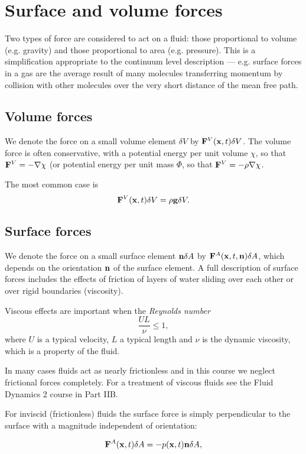 \documentclass{notes}
\newcommand{\grad}{\nabla}
\begin{document}
\section{Surface and volume forces}

Two types of force are considered to act on a fluid: those
proportional to volume (e.g. gravity) and those proportional to area
(e.g. pressure).  This is a simplification appropriate to the
continuum level description --- e.g. surface forces in a gas are the
average result of many molecules transferring momentum by collision
with other molecules over the very short distance of the mean free
path.

\subsection*{Volume forces}

We denote the force on a small volume element $\delta V$ by
$\mathbf{F}^V(\mathbf{x},t) \delta V$.  The volume force is often conservative, with a
potential energy per unit volume $\chi$, so that $\vF^V = -
\grad\chi$ (or potential energy per unit mass $\Phi$, so that $\vF^V
= - \rho \grad\chi$.

The most common case is
\[
\mathbf{F}^V(\mathbf{x},t) \delta V = \rho \mathbf{g} \delta V.
\]

\subsection*{Surface forces}

We denote the force on a small surface element $\mathbf{n} \delta A$ by
$\mathbf{F}^A(\mathbf{x},t,\mathbf{n}) \delta A$, which depends on the orientation $\mathbf{n}$ of the
surface element.  A full description of surface forces includes the
effects of friction of layers of water sliding over each other or over
rigid boundaries (viscosity).

Viscous effects are important when the \emph{Reynolds number}
\[
\frac{U L}{\nu} \le 1,
\]
where $U$ is a typical velocity, $L$ a typical length and $\nu$ is the
dynamic viscosity, which is a property of the fluid.

In many cases fluids act as nearly frictionless and in this course we
neglect frictional forces completely.  For a treatment of viscous
fluids see the Fluid Dynamics 2 course in Part IIB.

For inviscid (frictionless) fluids the surface force is simply
perpendicular to the surface with a magnitude independent of
orientation:

\[
\mathbf{F}^A(\mathbf{x},t) \delta A = - p(\mathbf{x},t) \mathbf{n} \delta A,
\]
\end{document}
